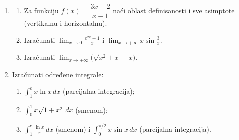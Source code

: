 \begin{enumerate}[label=\arabic*.]
  \item \begin{enumerate}[label=\alph*)]
    \item Za funkciju $f(x)=\dfrac{3x-2}{x-1}$ naći oblast definisanosti i sve asimptote (vertikalnu i horizontalnu).
    \item Izračunati $\displaystyle\lim_{x\to 0}\frac{e^{2x}-1}{x}$ i $\displaystyle\lim_{x\to+\infty} x\sin\frac{3}{x}$.
    \item Izračunati $\displaystyle\lim_{x\to+\infty}\bigl(\sqrt{x^2+x}-x\bigr)$.
  \end{enumerate}

  \item Izračunati određene integrale:
  \begin{enumerate}[label=\alph*)]
    \item $\displaystyle\int_{1}^{e} x\ln x\,dx$ \;(parcijalna integracija);
    \item $\displaystyle\int_{0}^{1} x\sqrt{1+x^2}\,dx$ \;(smenom);
    \item $\displaystyle\int_{1}^{e} \frac{\ln x}{x}\,dx$ \;(smenom) \; i \; $\displaystyle\int_{0}^{\pi/2} x\sin x\,dx$ \;(parcijalna integracija).
  \end{enumerate}
\end{enumerate}
\clearpage
